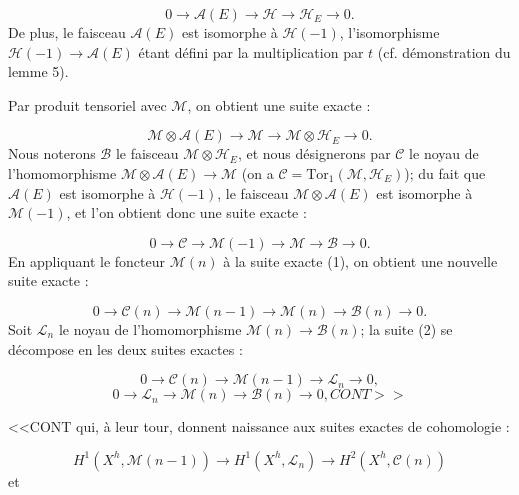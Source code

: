 \begin{equation*}
0 \to \mathcal{A}(E) \to \mathcal{H} \to \mathcal{H}_E \to 0.
\end{equation*}
De plus, le faisceau $\mathcal{A}(E)$ est isomorphe à $\mathcal{H}(-1)$, l'isomorphisme $\mathcal{H}(-1) \to \mathcal{A}(E)$ étant défini par la multiplication par $t$ (cf. démonstration du lemme 5).

Par produit tensoriel avec $\mathcal{M}$, on obtient une suite exacte :

\begin{equation*}
\mathcal{M} \otimes \mathcal{A}(E) \to \mathcal{M} \to \mathcal{M} \otimes \mathcal{H}_E \to 0.
\end{equation*}
Nous noterons $\mathcal{B}$ le faisceau $\mathcal{M} \otimes \mathcal{H}_E$, et nous désignerons par $\mathcal{C}$ le noyau de l'homomorphisme $\mathcal{M} \otimes \mathcal{A}(E) \to \mathcal{M}$ (on a $\mathcal{C} = \mathrm{Tor}_1(\mathcal{M}, \mathcal{H}_E)$); du fait que $\mathcal{A}(E)$ est isomorphe à $\mathcal{H}(-1)$, le faisceau $\mathcal{M} \otimes \mathcal{A}(E)$ est isomorphe à $\mathcal{M}(-1)$, et l'on obtient donc une suite exacte :

\begin{equation*}
0 \to \mathcal{C} \to \mathcal{M}(-1) \to \mathcal{M} \to \mathcal{B} \to 0.
\end{equation*}
En appliquant le foncteur $\mathcal{M}(n)$ à la suite exacte (1), on obtient une nouvelle suite exacte :

\begin{equation}\tag{2}
0 \to \mathcal{C}(n) \to \mathcal{M}(n-1) \to \mathcal{M}(n) \to \mathcal{B}(n) \to 0.
\end{equation}
Soit $\mathcal{L}_n$ le noyau de l'homomorphisme $\mathcal{M}(n) \to \mathcal{B}(n)$; la suite (2) se décompose en les deux suites exactes :

\begin{equation}\tag{3}
0 \to \mathcal{C}(n) \to \mathcal{M}(n-1) \to \mathcal{L}_n \to 0,
\end{equation}
\begin{equation}\tag{4}
0 \to \mathcal{L}_n \to \mathcal{M}(n) \to \mathcal{B}(n) \to 0, CONT>>
\end{equation}


<<CONT qui, à leur tour, donnent naissance aux suites exactes de cohomologie :

\begin{equation}\tag{5}
H^1(X^h, \mathcal{M}(n-1)) \to H^1(X^h, \mathcal{L}_n) \to H^2(X^h, \mathcal{C}(n))
\end{equation}
et

